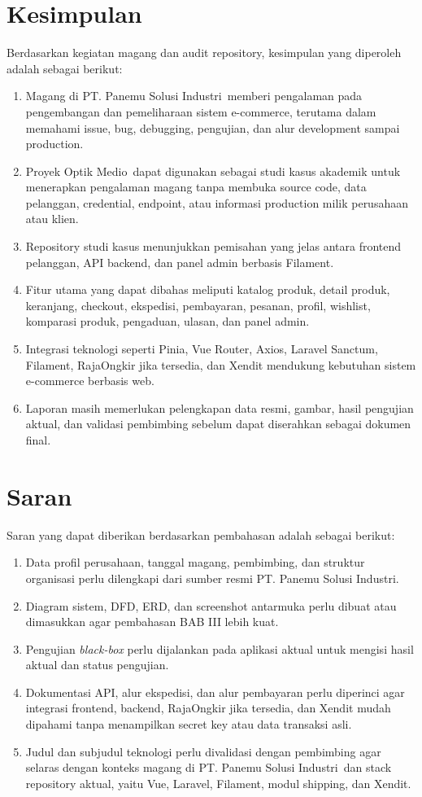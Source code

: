 \documentclass[12pt,a4paper,oneside]{report}
\newcommand{\tempatmagang}{PT. Panemu Solusi Industri}
\newcommand{\proyekstudi}{Optik Medio}
\begin{document}
\section{Kesimpulan}

Berdasarkan kegiatan magang dan audit repository, kesimpulan yang diperoleh adalah sebagai berikut:

\begin{enumerate}
  \item Magang di \tempatmagang\ memberi pengalaman pada pengembangan dan pemeliharaan sistem e-commerce, terutama dalam memahami issue, bug, debugging, pengujian, dan alur development sampai production.
  \item Proyek \proyekstudi\ dapat digunakan sebagai studi kasus akademik untuk menerapkan pengalaman magang tanpa membuka source code, data pelanggan, credential, endpoint, atau informasi production milik perusahaan atau klien.
  \item Repository studi kasus menunjukkan pemisahan yang jelas antara frontend pelanggan, API backend, dan panel admin berbasis Filament.
  \item Fitur utama yang dapat dibahas meliputi katalog produk, detail produk, keranjang, checkout, ekspedisi, pembayaran, pesanan, profil, wishlist, komparasi produk, pengaduan, ulasan, dan panel admin.
  \item Integrasi teknologi seperti Pinia, Vue Router, Axios, Laravel Sanctum, Filament, RajaOngkir jika tersedia, dan Xendit mendukung kebutuhan sistem e-commerce berbasis web.
  \item Laporan masih memerlukan pelengkapan data resmi, gambar, hasil pengujian aktual, dan validasi pembimbing sebelum dapat diserahkan sebagai dokumen final.
\end{enumerate}

\section{Saran}

Saran yang dapat diberikan berdasarkan pembahasan adalah sebagai berikut:

\begin{enumerate}
  \item Data profil perusahaan, tanggal magang, pembimbing, dan struktur organisasi perlu dilengkapi dari sumber resmi \tempatmagang.
  \item Diagram sistem, DFD, ERD, dan screenshot antarmuka perlu dibuat atau dimasukkan agar pembahasan BAB III lebih kuat.
  \item Pengujian \textit{black-box} perlu dijalankan pada aplikasi aktual untuk mengisi hasil aktual dan status pengujian.
  \item Dokumentasi API, alur ekspedisi, dan alur pembayaran perlu diperinci agar integrasi frontend, backend, RajaOngkir jika tersedia, dan Xendit mudah dipahami tanpa menampilkan secret key atau data transaksi asli.
  \item Judul dan subjudul teknologi perlu divalidasi dengan pembimbing agar selaras dengan konteks magang di \tempatmagang\ dan stack repository aktual, yaitu Vue, Laravel, Filament, modul shipping, dan Xendit.
\end{enumerate}
\end{document}
